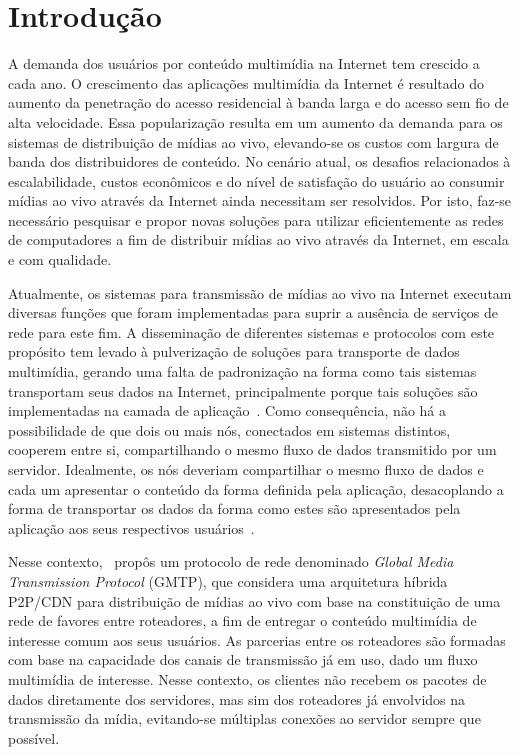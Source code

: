 \chapter{Introdução}
\label{cap:intro}
 
A demanda dos usuários por conteúdo multimídia na Internet tem crescido a cada ano. 
O crescimento das aplicações multimídia da Internet é resultado do aumento da penetração do acesso residencial à banda larga e do acesso sem fio de alta velocidade. Essa popularização resulta em um aumento da demanda para os sistemas de distribuição de mídias ao vivo, elevando-se os custos com largura de banda dos distribuidores de conteúdo.%
No cenário atual, os desafios relacionados à escalabilidade, custos econômicos e do nível de satisfação do usuário ao consumir mídias ao vivo através da Internet ainda necessitam ser resolvidos.%
Por isto, faz-se necessário pesquisar e propor novas soluções para utilizar eficientemente as redes de computadores a fim de distribuir mídias ao vivo através da Internet, em escala e com qualidade.

Atualmente, os sistemas para transmissão de mídias ao vivo na Internet executam diversas funções que foram implementadas para suprir a ausência de serviços de rede para este fim. 
A disseminação de diferentes sistemas e protocolos com este propósito tem levado à pulverização de soluções para transporte de dados multimídia, gerando uma falta de padronização na forma como tais sistemas transportam seus dados na Internet, principalmente porque tais soluções são implementadas na camada de aplicação~\cite{liu2008friendly}.
Como consequência, não há a possibilidade de que dois ou mais nós, conectados em sistemas distintos, cooperem entre si, compartilhando o mesmo fluxo de dados transmitido por um servidor. Idealmente, os nós deveriam compartilhar o mesmo fluxo de dados e cada um apresentar o conteúdo da forma definida pela aplicação, desacoplando a forma de transportar os dados da forma como estes são apresentados pela aplicação aos seus respectivos usuários~\cite{sales2014gmtp}.

Nesse contexto,~ propôs um protocolo de rede denominado \textit{Global Media Transmission Protocol} (GMTP), que considera uma arquitetura híbrida P2P/CDN para distribuição de mídias ao vivo com base na constituição de uma rede de favores entre roteadores, a fim de entregar o conteúdo multimídia de interesse comum aos seus usuários. 
As parcerias entre os roteadores são formadas com base na capacidade dos canais de transmissão já em uso, dado um fluxo multimídia de interesse. Nesse contexto, os clientes não recebem os pacotes de dados diretamente dos servidores, mas sim dos roteadores já envolvidos na transmissão da mídia, evitando-se múltiplas conexões ao servidor sempre que possível.

